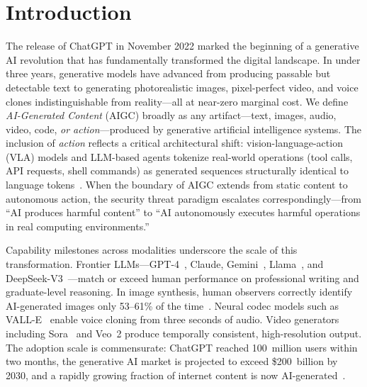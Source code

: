 
\section{Introduction}
\label{sec:introduction}


The release of ChatGPT in November 2022 marked the beginning of a generative AI revolution that has fundamentally transformed the digital landscape. In under three years, generative models have advanced from producing passable but detectable text to generating photorealistic images, pixel-perfect video, and voice clones indistinguishable from reality---all at near-zero marginal cost. We define \emph{AI-Generated Content} (AIGC) broadly as any artifact---text, images, audio, video, code, \emph{or action}---produced by generative artificial intelligence systems. The inclusion of \emph{action} reflects a critical architectural shift: vision-language-action (VLA) models and LLM-based agents tokenize real-world operations (tool calls, API requests, shell commands) as generated sequences structurally identical to language tokens~\cite{wang2024agentsurvey}. When the boundary of AIGC extends from static content to autonomous action, the security threat paradigm escalates correspondingly---from ``AI produces harmful content'' to ``AI autonomously executes harmful operations in real computing environments.''

Capability milestones across modalities underscore the scale of this transformation. Frontier LLMs---GPT-4~\cite{gpt4}, Claude, Gemini~\cite{gemini2024}, Llama~\cite{llama3}, and DeepSeek-V3~\cite{deepseekv3}---match or exceed human performance on professional writing and graduate-level reasoning. In image synthesis, human observers correctly identify AI-generated images only 53--61\% of the time~\cite{microsoft2025human}. Neural codec models such as VALL-E~\cite{wang2023valle} enable voice cloning from three seconds of audio. Video generators including Sora~\cite{brooks2024sora} and Veo~2 produce temporally consistent, high-resolution output. The adoption scale is commensurate: ChatGPT reached 100~million users within two months, the generative AI market is projected to exceed \$200~billion by 2030, and a rapidly growing fraction of internet content is now AI-generated~\cite{graphite2025aicontent}.

